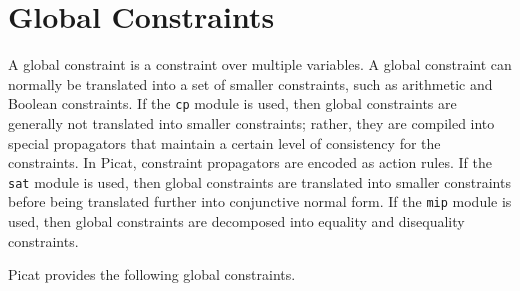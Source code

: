 \section{Global Constraints}
A global constraint is a constraint over multiple variables. A global constraint can normally be translated into a set of smaller constraints, such as arithmetic and Boolean constraints. If the \texttt{cp} module is used, then global constraints are generally not translated into smaller constraints; rather, they are compiled into special propagators that maintain a certain level of consistency for the constraints. In Picat, constraint propagators are encoded as action rules. If the \texttt{sat} module is used, then global constraints are translated into smaller constraints before being translated further into conjunctive normal form. If the \texttt{mip} module is used, then global constraints are decomposed into equality and disequality constraints.

Picat provides the following global constraints.


